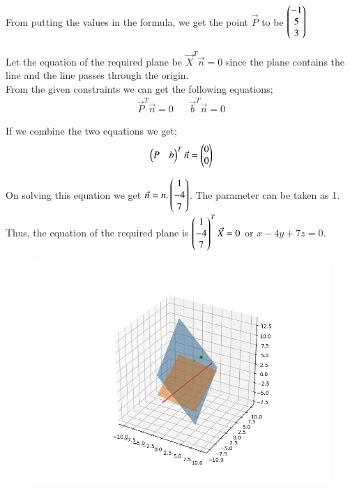 \documentclass[journal]{IEEEtran}
\begin{document}
From putting the values in the formula, we get the point $\Vec{P}$ to be $\begin{pmatrix}-1 \\ 5 \\ 3\end{pmatrix}$

Let the equation of the required plane be $\Vec{X}^T\Vec{n}=0$ since the plane contains the line and the line passes through the origin. \\

From the given constraints we can get the following equations;
\begin{align}
\Vec{P}^T\Vec{n}=0 && \Vec{b}^T\Vec{n}=0
\end{align}

If we combine the two equations we get;
\begin{align}
\begin{pmatrix}P & b\end{pmatrix}^T\Vec{n}=\begin{pmatrix}0 \\ 0\end{pmatrix}
\end{align}

On solving this equation we get $\Vec{n}=n.\begin{pmatrix}1 \\ -4 \\ 7\end{pmatrix}$. The parameter can be taken as 1. \\

Thus, the equation of the required plane is $\begin{pmatrix}1 \\ -4 \\ 7\end{pmatrix}^T\Vec{X}=0$ or $x-4y+7z=0$.

\begin{figure}[H]
\centering
\includegraphics[width=0.8\columnwidth]{figs/img.png}
\caption*{}
\end{figure}
\end{document}
